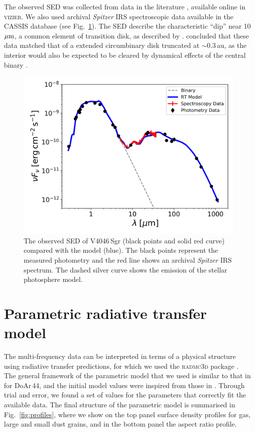 \documentclass[fleqn,usenatbib,useAMS]{mnras}
\begin{document}
The observed SED was collected from data in the literature \citep{1988iras....7.....H, 1990A&A...234..230H, Jensen_97, 2000A&A...355L..27H, 2001KFNT...17..409K, 2003yCat.2246....0C, 2007PASJ...59S.369M, 2008PASP..120.1128O, 2010A&A...514A...1I, 2012yCat.2311....0C}, available online in \textsc{vizier}. We also  used  archival \textit{Spitzer} IRS spectroscopic data available in the CASSIS database \citep{Lebouteiller_2015} (see Fig.~\ref{fig:SED}). The SED describe the characteristic “dip” near 10 $\hbox{$\mu$m}$, a common element of transition disk, as described by \citet{Rosenfeld_2013}. \citet{Jensen_97} concluded that these data matched that of a extended circumbinary disk truncated at $\sim$0.3\,au, as the interior would also be expected to be cleared by dynamical effects of the central binary \citep{Art_Lu}.

\begin{figure}
	\centering
	\includegraphics[width=\columnwidth]{SED_.png}
    \caption{The observed SED of V4046\,Sgr (black points and solid red curve) compared with the model (blue). The black points represent the measured photometry and the red line shows an archival \textit{Spitzer} IRS spectrum. The dashed silver curve shows the emission of the stellar photosphere model.}
    \label{fig:SED}
\end{figure}

\section{Parametric radiative transfer model} \label{sec:model}

The multi-frequency data can be interpreted in terms of a physical structure using radiative transfer predictions, for which we used the \textsc{radmc3d} package \citep{Dullemond_2012}. The general framework of the parametric model that we used is similar to that in \citet{2018MNRAS.477.5104C} for DoAr\,44, and the initial model values were inspired from those in \citet{Rosenfeld_2013}. Through trial and error, we found a set of values for the parameters that correctly fit the available data. The final structure of the parametric model is summarised in  Fig.~\ref{fig:profiles}, where we show on the top panel surface density profiles for gas, large and small dust grains, and in the bottom panel the aspect ratio profile.
\end{document}
